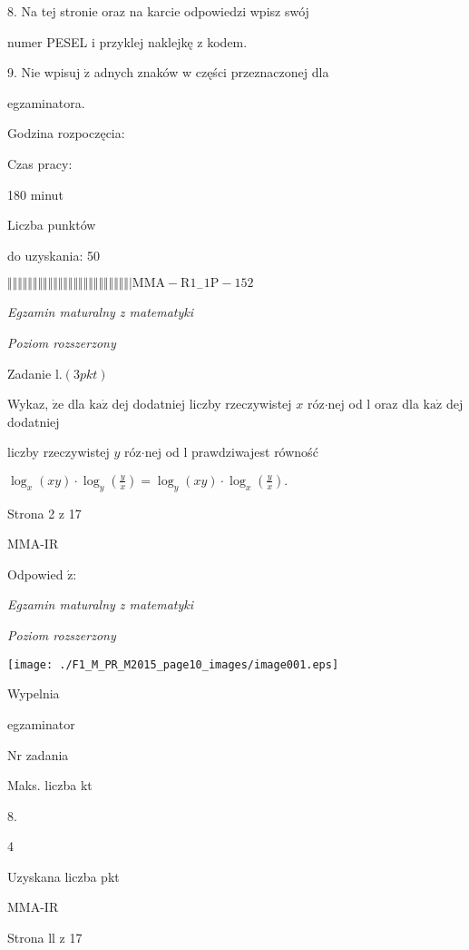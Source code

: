 \documentclass[a4paper,12pt]{article}
\begin{document}
8. Na tej stronie oraz na karcie odpowiedzi wpisz swój

numer PESEL i przyklej naklejkę z kodem.

9. Nie wpisuj $\dot{\mathrm{z}}$ adnych znaków w części przeznaczonej dla

egzaminatora.

Godzina rozpoczęcia:

Czas pracy:

180 minut

Liczba punktów

do uzyskania: 50

$\Vert\Vert\Vert\Vert\Vert\Vert\Vert\Vert\Vert\Vert\Vert\Vert\Vert\Vert\Vert\Vert\Vert\Vert\Vert\Vert\Vert\Vert\Vert\Vert|  \mathrm{M}\mathrm{M}\mathrm{A}-\mathrm{R}1_{-}1\mathrm{P}-152$




{\it Egzamin maturalny z matematyki}

{\it Poziom rozszerzony}

Zadanie l.$(3pkt)$

Wykaz, $\dot{\mathrm{z}}\mathrm{e}$ dla $\mathrm{k}\mathrm{a}\dot{\mathrm{z}}$ dej dodatniej liczby rzeczywistej $x$ róz$\cdot$nej od l oraz dla $\mathrm{k}\mathrm{a}\dot{\mathrm{z}}$ dej dodatniej

liczby rzeczywistej $y$ róz$\cdot$nej od l prawdziwajest równość

$\displaystyle \log_{x}(xy)\cdot\log_{y}(\frac{y}{x})=\log_{y}(xy)\cdot\log_{x}(\frac{y}{x}).$

Strona 2 z 17

MMA-IR





Odpowied $\acute{\mathrm{z}}$:

{\it Egzamin maturalny z matematyki}

{\it Poziom rozszerzony}
\begin{center}
\texttt{[image: ./F1\_M\_PR\_M2015\_page10\_images/image001.eps]}
\end{center}
Wypelnia

egzaminator

Nr zadania

Maks. liczba kt

8.

4

Uzyskana liczba pkt

MMA-IR

Strona ll z 17
\end{document}
